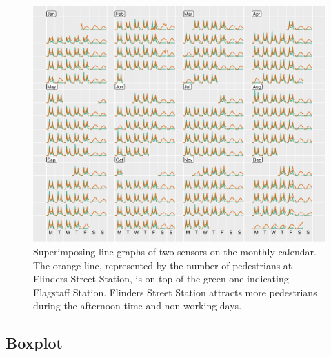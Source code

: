 \documentclass[article]{jss}
\begin{document}
\begin{CodeChunk}
\begin{figure}

{\centering \includegraphics[width=\textwidth]{figure/overlay-1} 

}

\caption[Superimposing line graphs of two sensors on the monthly calendar]{Superimposing line graphs of two sensors on the monthly calendar. The orange line, represented by the number of pedestrians at Flinders Street Station, is on top of the green one indicating Flagstaff Station. Flinders Street Station attracts more pedestrians during the afternoon time and non-working days.}\label{fig:overlay}
\end{figure}
\end{CodeChunk}

\subsection{Boxplot}\label{boxplot}
\end{document}
